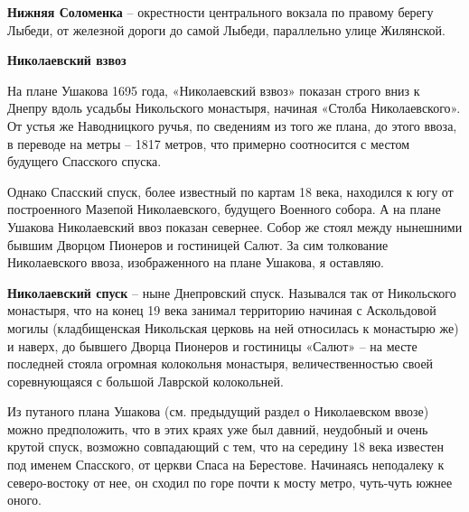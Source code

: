 \medskip

\textbf{Нижняя Соломенка} – окрестности центра\-льного вокзала по правому берегу Лыбеди, от железной дороги до самой Лыбеди, параллельно улице Жилянской.\\


\medskip

\textbf{Николаевский взвоз}

На плане Ушакова 1695 года, «Николаевский взвоз» показан строго вниз к Днепру вдоль усадьбы Никольского монастыря, начиная «Столба Николаевского». От устья же Наводницкого ручья, по сведениям из того же плана, до этого ввоза, в переводе на метры – 1817 метров, что примерно соотносится с местом будущего Спасского спуска. 

Однако Спасский спуск, более известный по картам 18 века, находился к югу от построенного Мазепой Николаевского, будущего Военного собора. А на плане Ушакова Николаевский ввоз показан севернее. Собор же стоял между нынешними бывшим Дворцом Пионеров и гостиницей Салют. За сим толкование Николаевского ввоза, изображенного на плане Ушакова, я оставляю. \\


\medskip







\textbf{Николаевский спуск} – ныне Днепровский спуск. Назывался так от Никольского монастыря, что на конец 19 века занимал территорию начиная с Аскольдовой могилы (кладбищенская Никольская церковь на ней относилась к монастырю же) и наверх, до бывшего Дворца Пионеров и гостиницы «Салют» – на месте последней стояла огромная колокольня монастыря, величественностью своей соревнующаяся с большой Лаврской колокольней.

Из путаного плана Ушакова (см. предыдущий раздел о Николаевском ввозе) можно предположить, что в этих краях уже был давний, неудобный и очень крутой спуск, возможно совпадающий с тем, что на середину 18 века известен под именем Спасского, от церкви Спаса на Берестове. Начинаясь неподалеку к северо-востоку от нее, он сходил по горе почти к мосту метро, чуть-чуть южнее оного. 

